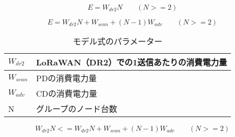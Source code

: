 \begin{equation}
    \label{fig:model_lora}
    E = W_{dr2}N \qquad (N>=2)
\end{equation}

\begin{equation}
    \label{fig:model_group}
    E = W_{dr2}N + W_{scan} + (N-1)W_{adv} \qquad (N>=2)
\end{equation}

\begin{table}[]
    \caption{モデル式のパラメーター}
    \label{fig:model_param}
    \centering
    \begin{tabular}{|l|l|}
    \hline
    $W_{dr2}$  & LoRaWAN（DR2）での1送信あたりの消費電力量 \\ \hline
    $W_{scan}$ & PDの消費電力量                   \\ \hline
    $W_{adv}$  & CDの消費電力量                   \\ \hline
    N           & グループのノード台数                 \\ \hline
    \end{tabular}
\end{table}

\begin{equation}
    \label{fig:model_lora_group}
    W_{dr2}N <= W_{dr2}N + W_{scan} + (N-1)W_{adv} \qquad (N>=2)
\end{equation}